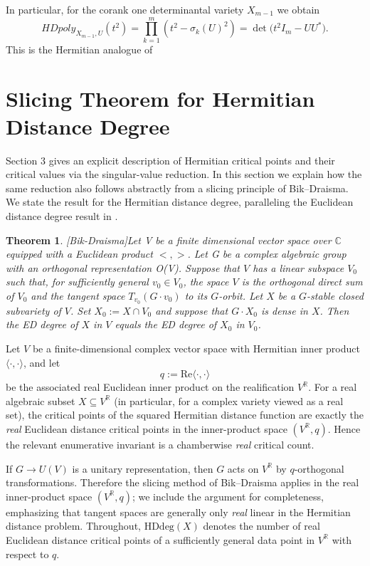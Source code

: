\documentclass[11pt]{amsart}
\def\R{\mathbb R}\let\er\R
\theoremstyle{plain}
\newtheorem{theorem}{Theorem}
\theoremstyle{definition}
\theoremstyle{remark}
\begin{document}
In particular, for the corank one determinantal variety $X_{m-1}$ we obtain
\[
HDpoly_{X_{m-1},U}(t^2)
=
\prod_{k=1}^m (t^2-\sigma_k(U)^2)
=
\det\!\bigl(t^2I_m-UU^*\bigr).
\]
This is the Hermitian analogue of \cite[Theorem~8.1]{OS}










\newpage

\section{Slicing Theorem for Hermitian Distance Degree}
Section 3 gives an explicit description of Hermitian critical points and their critical values via the singular-value reduction. In this section we explain how the same reduction also follows abstractly from a slicing principle of Bik–Draisma. We state the result for the Hermitian distance degree, paralleling the
Euclidean distance degree result in \cite{bik2018eddegrees}.
\begin{theorem}\cite{bik2018eddegrees}[Bik-Draisma]\label{BD} Let V be a finite dimensional vector space over $\mathbb{C}$ equipped with a Euclidean product $<,>$. Let G be a complex algebraic group with an orthogonal representation O(V).
    Suppose that $V$ has a linear subspace $V_0$ such that, for sufficiently 
general $v_0 \in V_0$, the space $V$ is the orthogonal direct sum of $V_0$ 
and the tangent space $T_{v_0}(G \cdot v_0)$ to its $G$-orbit. 
Let $X$ be a $G$-stable closed subvariety of $V$. 
Set $X_0 := X \cap V_0$ and suppose that $G \cdot X_0$ is dense in $X$. 
Then the ED degree of $X$ in $V$ equals the ED degree of $X_0$ in $V_0$.

\end{theorem}


Let $V$ be a finite-dimensional complex vector space with Hermitian inner product
$\langle\cdot,\cdot\rangle$, and let
\[
q:=\mathrm{Re}\langle\cdot,\cdot\rangle
\]
be the associated real Euclidean inner product on the realification $V^{\R}$.
For a real algebraic subset $X\subseteq V^{\R}$ (in particular, for a complex variety viewed as a real set),
the critical points of the squared Hermitian distance function are exactly the \emph{real} Euclidean
distance critical points in the inner-product space $(V^{\R},q)$. Hence the relevant enumerative invariant
is a chamberwise \emph{real} critical count.

If $G\to U(V)$ is a unitary representation, then $G$ acts on $V^{\R}$ by $q$-orthogonal transformations.
Therefore the slicing method of Bik--Draisma \cite{bik2018eddegrees} applies in the real inner-product space
$(V^{\R},q)$; we include the argument for completeness, emphasizing that tangent spaces are generally only
\emph{real} linear in the Hermitian distance problem.
Throughout, $\mathrm{HDdeg}(X)$ denotes the number of real Euclidean distance critical points of a sufficiently
general data point in $V^{\R}$ with respect to $q$.
\end{document}
